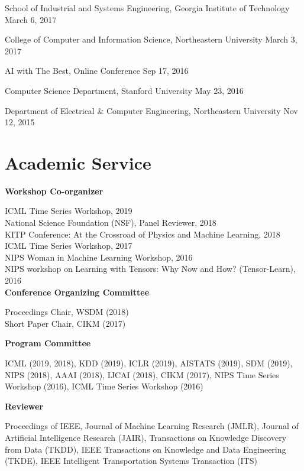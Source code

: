 \documentclass[margin,line]{res}
\begin{document}
\begin{resume}
School of Industrial and Systems Engineering, Georgia Institute of Technology  \hfill {March 6, 2017}


College of Computer and Information Science, Northeastern University  \hfill {March 3, 2017}


 
 AI with The Best, Online Conference \hfill {Sep 17, 2016}
 
 
Computer Science Department,  Stanford University  \hfill {May 23, 2016}
 
 
Department of  Electrical \& Computer Engineering,  Northeastern University  \hfill {Nov 12, 2015}


\section{\sc Academic Service}
{\bf Workshop Co-organizer}

ICML Time Series  Workshop, 2019 \\
National Science Foundation (NSF),  Panel Reviewer, 2018\\
KITP Conference: At the Crossroad of Physics and Machine Learning, 2018\\
ICML Time Series  Workshop, 2017 \\
NIPS Woman in Machine Learning Workshop, 2016 \\
NIPS workshop on Learning with Tensors: Why Now and How? (Tensor-Learn), 2016 \\



{\bf Conference Organizing Committee}

Proceedings Chair, WSDM (2018)\\
Short Paper Chair, CIKM (2017)

{\bf Program Committee}

ICML (2019, 2018), KDD (2019), ICLR (2019), AISTATS (2019), SDM (2019), NIPS (2018),  AAAI (2018), IJCAI (2018), CIKM (2017), NIPS Time Series Workshop (2016), ICML Time Series Workshop (2016) 


{\bf Reviewer}

Proceedings of IEEE, Journal of Machine Learning Research (JMLR), Journal of Artificial Intelligence Research (JAIR), Transactions on Knowledge Discovery from Data (TKDD), IEEE Transactions on Knowledge and Data Engineering (TKDE),  IEEE Intelligent Transportation Systems Transaction (ITS)




\end{resume}
\end{document}
